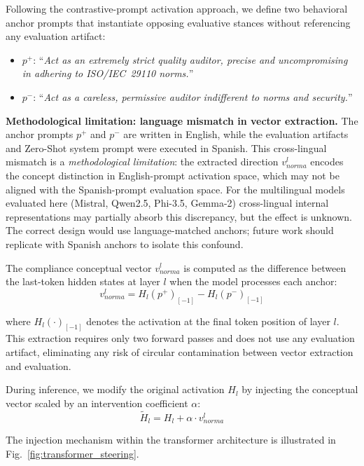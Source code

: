 \documentclass{ieeeaccess}
\begin{document}
Following the contrastive-prompt activation approach, we define two behavioral anchor prompts that instantiate opposing evaluative stances without referencing any evaluation artifact:
\begin{itemize}
    \item $p^+$: ``\textit{Act as an extremely strict quality auditor, precise and uncompromising in adhering to ISO/IEC~29110 norms.}''
    \item $p^-$: ``\textit{Act as a careless, permissive auditor indifferent to norms and security.}''
\end{itemize}

\textbf{Methodological limitation: language mismatch in vector extraction.} The anchor prompts $p^+$ and $p^-$ are written in English, while the evaluation artifacts and Zero-Shot system prompt were executed in Spanish. This cross-lingual mismatch is a \emph{methodological limitation}: the extracted direction $v_{norma}^l$ encodes the concept distinction in English-prompt activation space, which may not be aligned with the Spanish-prompt evaluation space. For the multilingual models evaluated here (Mistral, Qwen2.5, Phi-3.5, Gemma-2) cross-lingual internal representations may partially absorb this discrepancy, but the effect is unknown. The correct design would use language-matched anchors; future work should replicate with Spanish anchors to isolate this confound.

The compliance conceptual vector $v_{norma}^l$ is computed as the difference between the last-token hidden states at layer $l$ when the model processes each anchor:
\begin{equation}
v_{norma}^l = H_l(p^+)_{[-1]} - H_l(p^-)_{[-1]}
\label{eq:steering_vector}
\end{equation}

where $H_l(\cdot)_{[-1]}$ denotes the activation at the final token position of layer $l$. This extraction requires only two forward passes and does not use any evaluation artifact, eliminating any risk of circular contamination between vector extraction and evaluation.

During inference, we modify the original activation $H_l$ by injecting the conceptual vector scaled by an intervention coefficient $\alpha$:
\begin{equation}
\tilde{H}_l = H_l + \alpha \cdot v_{norma}^l
\label{eq:steering_injection}
\end{equation}

The injection mechanism within the transformer architecture is illustrated in Fig.~\ref{fig:transformer_steering}.
\end{document}
